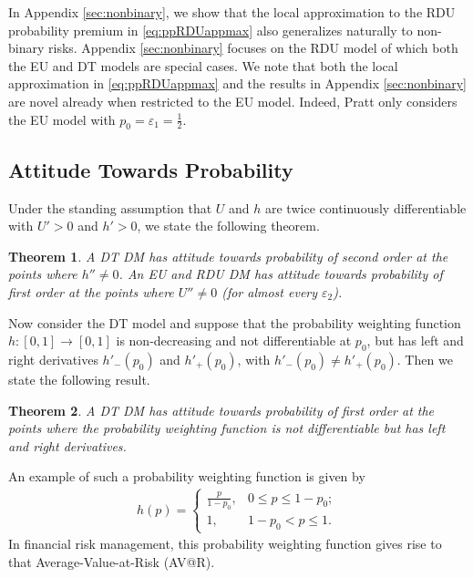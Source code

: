 \documentclass[11pt]{article}
\newtheorem{theorem}{Theorem}[section]
\begin{document}
In Appendix \ref{sec:nonbinary}, we show that the local approximation to the RDU probability premium in \eqref{eq:ppRDUappmax}
also generalizes naturally to non-binary risks.
Appendix \ref{sec:nonbinary} focuses on the RDU model of which both the EU and DT models are special cases.
We note that both the local approximation in \eqref{eq:ppRDUappmax} and the results in Appendix \ref{sec:nonbinary}
are novel already when restricted to the EU model.
Indeed, Pratt \cite{P64} only considers the EU model with $p_{0}=\varepsilon_{1}=\tfrac{1}{2}$.

\subsection{Attitude Towards Probability}

Under the standing assumption that $U$ and $h$ are twice continuously differentiable
with $U'>0$ and $h'>0$,
we state the following theorem.
\begin{theorem}
A DT DM
has attitude towards probability of second order
at the points where $h''\neq 0$.
An EU and RDU DM
has attitude towards probability of first order
at the points where $U''\neq 0$
(for almost every $\varepsilon_{2}$).
\label{th:ordpa}
\end{theorem}

Now consider the DT model and suppose that the probability weighting function $h:[0,1]\rightarrow[0,1]$
is non-decreasing and not differentiable at $p_{0}$,
but has left and right derivatives $h'_{-}(p_{0})$ and $h'_{+}(p_{0})$,
with $h'_{-}(p_{0})\neq h'_{+}(p_{0})$.
Then we state the following result.
\begin{theorem}
A DT DM
has attitude towards probability of first order
at the points where the probability weighting function is not differentiable
but has left and right derivatives.
\label{th:ordpanondiff}
\end{theorem}

An example of such a probability weighting function is given by
\begin{align}
h(p)=\left\{
       \begin{array}{ll}
         \frac{p}{1-p_{0}}, & 0\leq p\leq 1-p_{0};\\
         1, & 1-p_{0}<p\leq 1.
       \end{array}
     \right.
\end{align}
In financial risk management, this probability weighting function gives rise to that Average-Value-at-Risk (AV@R).
\end{document}
